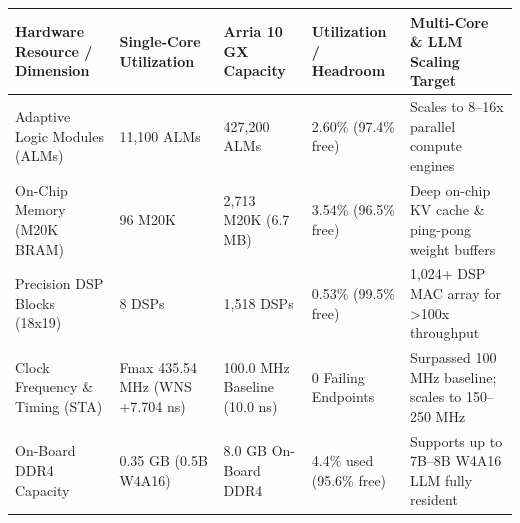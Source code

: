 \documentclass[11pt,a4paper]{article}
\begin{document}
{\footnotesize\renewcommand{\arraystretch}{1.14}\begin{longtable}{@{}L{0.21\textwidth}L{0.16\textwidth}L{0.16\textwidth}L{0.15\textwidth}L{0.22\textwidth}@{}}\toprule

\textbf{Hardware Resource /\allowbreak{} Dimension} & \textbf{Single-Core Utilization} & \textbf{Arria 10 GX Capacity} & \textbf{Utilization /\allowbreak{} Headroom} & \textbf{Multi-Core \& LLM Scaling Target}\\\midrule\endhead

Adaptive Logic Modules (\allowbreak{}ALMs)\allowbreak{} & 11,\allowbreak{}100 ALMs & 427,\allowbreak{}200 ALMs & 2.60\% (\allowbreak{}97.4\% free)\allowbreak{} & Scales to 8--16x parallel compute engines\\[2pt]

On-Chip Memory (\allowbreak{}M20K BRAM)\allowbreak{} & 96 M20K & 2,\allowbreak{}713 M20K (\allowbreak{}6.7 MB)\allowbreak{} & 3.54\% (\allowbreak{}96.5\% free)\allowbreak{} & Deep on-chip KV cache \& ping-pong weight buffers\\[2pt]

Precision DSP Blocks (\allowbreak{}18x19)\allowbreak{} & 8 DSPs & 1,\allowbreak{}518 DSPs & 0.53\% (\allowbreak{}99.5\% free)\allowbreak{} & 1,\allowbreak{}024+\allowbreak{} DSP MAC array for >100x throughput\\[2pt]

Clock Frequency \& Timing (\allowbreak{}STA)\allowbreak{} & Fmax 435.54 MHz (\allowbreak{}WNS +\allowbreak{}7.704 ns)\allowbreak{} & 100.0 MHz Baseline (\allowbreak{}10.0 ns)\allowbreak{} & 0 Failing Endpoints & Surpassed 100 MHz baseline; scales to 150--250 MHz\\[2pt]

On-Board DDR4 Capacity & 0.35 GB (\allowbreak{}0.5B W4A16)\allowbreak{} & 8.0 GB On-Board DDR4 & 4.4\% used (\allowbreak{}95.6\% free)\allowbreak{} & Supports up to 7B--8B W4A16 LLM fully resident\\[2pt]

\bottomrule\end{longtable}}
\end{document}
